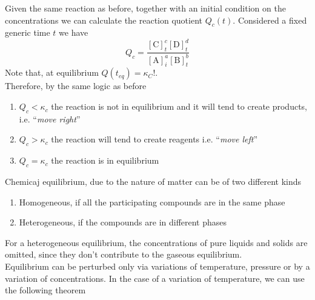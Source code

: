 \documentclass[../qm.tex]{subfiles}
\begin{document}
Given the same reaction as before, together with an initial condition on the concentrations we can calculate the reaction quotient $Q_c(t)$. Considered a fixed generic time $t$ we have
\begin{equation}
	Q_c=\frac{\left[ \mathrm{C} \right]^c_t\left[ \mathrm{D} \right]^d_t}{\left[ \mathrm{A} \right]^a_i\left[ \mathrm{B} \right]^b_t}
	\label{eq:qfactor.tch}
\end{equation}
Note that, at equilibrium $Q(t_{eq})=\kappa_C$!.\\
Therefore, by the same logic as before
\begin{enumerate}
\item $Q_c<\kappa_c$ the reaction is not in equilibrium and it will tend to create products, i.e. ``\textit{move right}''
\item $Q_c>\kappa_c$ the reaction will tend to create reagents i.e. ``\textit{move left}''
\item $Q_c=\kappa_c$ the reaction is in equilibrium
\end{enumerate}
Chemicaj equilibrium, due to the nature of matter can be of two different kinds
\begin{enumerate}
\item Homogeneous, if all the participating compounds are in the same phase
\item Heterogeneous, if the compounds are in different phases
\end{enumerate}
For a heterogeneous equilibrium, the concentrations of pure liquids and solids are omitted, since they don't contribute to the gaseous equilibrium.\\
Equilibrium can be perturbed only via variations of temperature, pressure or by a variation of concentrations. In the case of a variation of temperature, we can use the following theorem
\end{document}
